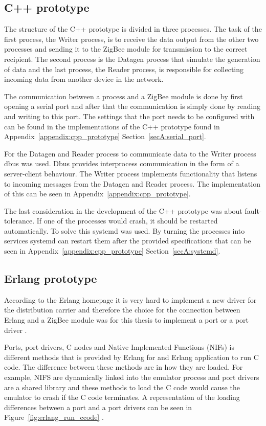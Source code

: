 \subsection{C++ prototype}
The structure of the C++ prototype is divided in three processes. The task of the first process, the Writer process, is to receive the data output from the other two processes and sending it to the ZigBee module for transmission to the correct recipient. The second process is the Datagen process that simulate the generation of data and the last process, the Reader process, is responsible for collecting incoming data from another device in the network.

The communication between a process and a ZigBee module is done by first opening a serial port and after that the communication is simply done by reading and writing to this port. The settings that the port needs to be configured with can be found in the implementations of the C++ prototype found in Appendix~\ref{appendix:cpp_prototype} Section~\ref{secA:serial_port}.

For the Datagen and Reader process to communicate data to the Writer process dbus was used. Dbus provides interprocess communication in the form of a server-client behaviour. The Writer process implements functionality that listens to incoming messages from the Datagen and Reader process. The implementation of this can be seen in Appendix~\ref{appendix:cpp_prototype}.

The last consideration in the development of the C++ prototype was about fault-tolerance. If one of the processes would crash, it should be restarted automatically. To solve this systemd was used. By turning the processes into services systemd can restart them after the provided specifications that can be seen in Appendix~\ref{appendix:cpp_prototype} Section~\ref{secA:systemd}. 

\subsection{Erlang prototype}
According to the Erlang homepage it is very hard to implement a new driver for the distribution carrier and therefore the choice for the connection between Erlang and a ZigBee module was for this thesis to implement a port or a port driver \citep{ericsson_ab_2019}. 

Ports, port drivers, C nodes and Native Implemented Functions (NIFs) is different methods that is provided by Erlang for and Erlang application to run C code. The difference between these methods are in how they are loaded. For example, NIFS are dynamically linked into the emulator process and port drivers are a shared library and these methods to load the C code would cause the emulator to crash if the C code terminates. A representation of the loading differences between a port and a port drivers can be seen in Figure~\ref{fig:erlang_run_ccode} \citep{ericsson_ab_2019}. 

